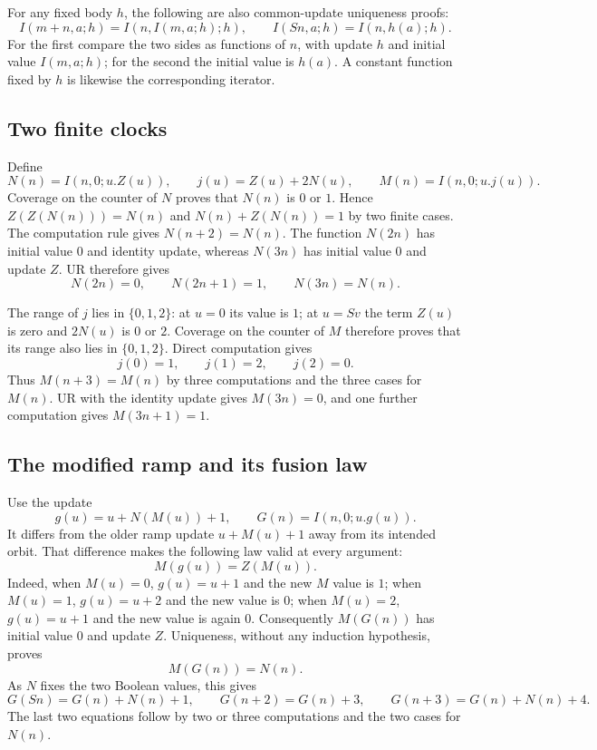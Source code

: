\documentclass[11pt]{article}
\begin{document}
For any fixed body $h$, the following are also common-update
uniqueness proofs:
\[
 I(m+n,a;h)=I(n,I(m,a;h);h),\qquad
 I(Sn,a;h)=I(n,h(a);h).
\]
For the first compare the two sides as functions of $n$, with update $h$
and initial value $I(m,a;h)$; for the second the initial value is $h(a)$.
A constant function fixed by $h$ is likewise the corresponding iterator.

\subsection{Two finite clocks}
Define
\[
 N(n)=I(n,0;u.Z(u)),\qquad j(u)=Z(u)+2N(u),\qquad
 M(n)=I(n,0;u.j(u)).
\]
Coverage on the counter of $N$ proves that $N(n)$ is $0$ or $1$.
Hence $Z(Z(N(n)))=N(n)$ and $N(n)+Z(N(n))=1$ by two finite cases.
The computation rule gives $N(n+2)=N(n)$.
The function $N(2n)$ has initial value $0$ and identity update, whereas
$N(3n)$ has initial value $0$ and update $Z$.  UR therefore gives
\[
 N(2n)=0,\qquad N(2n+1)=1,\qquad N(3n)=N(n).
\]

The range of $j$ lies in $\{0,1,2\}$: at $u=0$ its value is $1$;
at $u=Sv$ the term $Z(u)$ is zero and $2N(u)$ is $0$ or $2$.
Coverage on the counter of $M$ therefore proves that its range also lies
in $\{0,1,2\}$.  Direct computation gives
\[
 j(0)=1,\qquad j(1)=2,\qquad j(2)=0.
\]
Thus $M(n+3)=M(n)$ by three computations and the three cases for
$M(n)$.  UR with the identity update gives $M(3n)=0$, and one further
computation gives $M(3n+1)=1$.

\subsection{The modified ramp and its fusion law}
Use the update
\[
 g(u)=u+N(M(u))+1,\qquad G(n)=I(n,0;u.g(u)).
\]
It differs from the older ramp update $u+M(u)+1$ away from its intended
orbit.  That difference makes the following law valid at every argument:
\[
                         M(g(u))=Z(M(u)).                 \tag{1}
\]
Indeed, when $M(u)=0$, $g(u)=u+1$ and the new $M$ value is $1$;
when $M(u)=1$, $g(u)=u+2$ and the new value is $0$; when $M(u)=2$,
$g(u)=u+1$ and the new value is again $0$.
Consequently $M(G(n))$ has initial value $0$ and update $Z$.
Uniqueness, without any induction hypothesis, proves
\[
                             M(G(n))=N(n).                \tag{2}
\]
As $N$ fixes the two Boolean values, this gives
\[
 G(Sn)=G(n)+N(n)+1,\qquad G(n+2)=G(n)+3,
 \qquad G(n+3)=G(n)+N(n)+4.                               \tag{3}
\]
The last two equations follow by two or three computations and the
two cases for $N(n)$.
\end{document}
